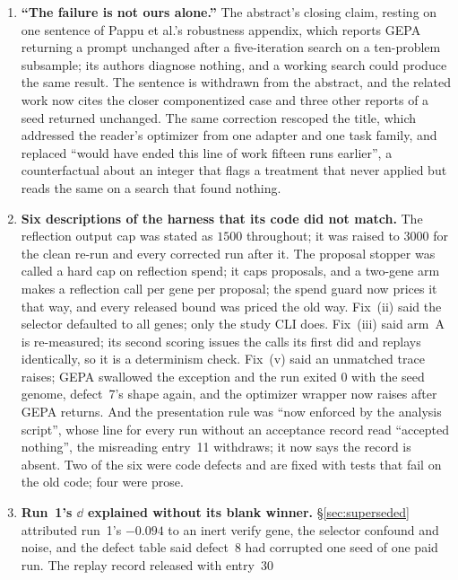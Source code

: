 \documentclass[11pt]{article}
\begin{document}
\begin{enumerate}
    quieter than the borrowed denominator'' compared a one-draw sd with the $\sigma$ of a
    difference of two draws; like for like, two of the six rows are noisier.
  \item \textbf{``The failure is not ours alone.''} The abstract's closing claim, resting on one
    sentence of Pappu et al.'s robustness appendix, which reports GEPA returning a prompt unchanged after a
    five-iteration search on a ten-problem subsample; its authors diagnose nothing, and a working
    search could produce the same result. The sentence is withdrawn from the
    abstract, and the related work now cites the closer componentized case and three other
    reports of a seed returned unchanged. The same correction rescoped the title, which addressed
    the reader's optimizer from one adapter and one task family, and replaced ``would have ended
    this line of work fifteen runs earlier'', a counterfactual about an integer that flags a
    treatment that never applied but reads the same on a search that found nothing.
  \item \textbf{Six descriptions of the harness that its code did not match.} The reflection
    output cap was stated as $1500$ throughout; it was raised to $3000$ for the clean re-run and
    every corrected run after it. The proposal stopper was called a hard cap on reflection spend;
    it caps proposals, and a two-gene arm makes a reflection call per gene per proposal; the spend
    guard now prices it that way, and every released bound was priced the old way. Fix~(ii)
    said the selector defaulted to all genes; only the study CLI does. Fix~(iii) said arm~A is
    re-measured; its second scoring issues the calls its first did and replays identically, so it
    is a determinism check. Fix~(v) said an unmatched trace raises; GEPA swallowed the exception and
    the run exited $0$ with the seed genome, defect~7's shape again, and the optimizer wrapper now
    raises after GEPA returns. And the presentation rule was ``now enforced by the analysis
    script'', whose line for every run without an acceptance record read ``accepted nothing'', the
    misreading entry~11 withdraws; it now says the record is absent. Two of the six were code
    defects and are fixed with tests that fail on the old code; four were prose.
  \item \textbf{Run~1's $\dd$ explained without its blank winner.} \S\ref{sec:superseded} attributed
    run~1's $-0.094$ to an inert verify gene, the selector confound and noise, and the defect table
    said defect~8 had corrupted one seed of one paid run. The replay record released with entry~30

\end{enumerate}
\end{document}
